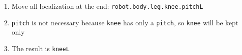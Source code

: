 \documentclass[a4paper]{article}
\begin{document}
\begin{enumerate}
\item {\sffamily
Move all localization at the end: \texttt{robot.body.leg.knee.pitchL}}
\item {\sffamily
\texttt{pitch} is not necessary because \texttt{knee} has only a
\texttt{pitch}, so \texttt{knee} will be kept only}
\item {\sffamily
The result is \texttt{kneeL}}
\end{enumerate}
\end{document}
